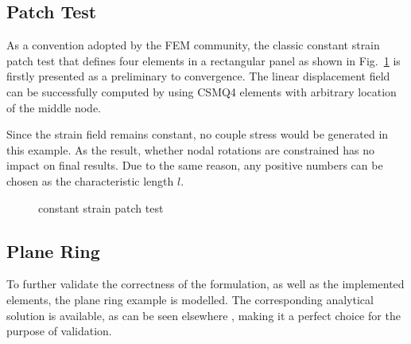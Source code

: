 \documentclass[3p,sort&compress,11pt,fleqn,review]{elsarticle}
\newcommand*{\alert}[1]{#1}
\newcommand*{\figref}[1]{Fig.~\ref{#1}}
\begin{document}
\subsection{Patch Test}
As a convention adopted by the FEM community, the classic constant strain patch test that defines four elements in a rectangular panel as shown in \figref{fig:csmq_patch} is firstly presented \alert{as a preliminary to convergence}. The linear displacement field can be successfully computed by using CSMQ4 elements with arbitrary location of the middle node.

Since the strain field remains constant, no couple stress would be generated in this example. As the result, whether nodal rotations are constrained has no impact on final results. Due to the same reason, any positive numbers can be chosen as the characteristic length $l$.
\begin{figure}[htb]
\centering\scriptsize
{}
\caption{constant strain patch test}\label{fig:csmq_patch}
\end{figure}
\subsection{Plane Ring}
\alert{To further validate the correctness of the formulation, as well as the implemented elements, the plane ring example is modelled. The corresponding analytical solution is available, as can be seen elsewhere \citep{Hadjesfandiari2011}, making it a perfect choice for the purpose of validation.}
\end{document}
